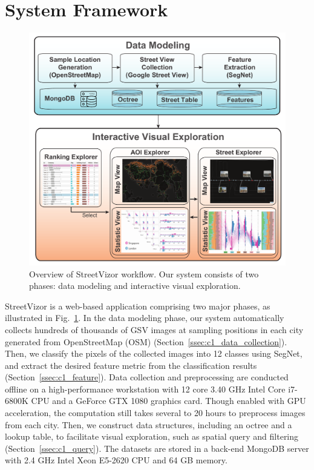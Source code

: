 \section{System Framework}



\begin{figure}[t]
	\centering
	\includegraphics[width=0.9\columnwidth]{figure/streetvizor/fig2_framework/framework}
	\vspace{-5mm}
	\caption{Overview of StreetVizor workflow. Our system consists of two phases: data modeling and interactive visual exploration.}
	\label{fig:c1_sys_overview}
	\vspace{-6mm}
\end{figure}

StreetVizor is a web-based application comprising two major phases, as illustrated in Fig.~\ref{fig:c1_sys_overview}.
In the data modeling phase, our system automatically collects hundreds of thousands of GSV images at sampling positions in each city generated from OpenStreetMap (OSM) (Section~\ref{ssec:c1_data_collection}).
Then, we classify the pixels of the collected images into 12 classes using SegNet, and extract the desired feature metric from the classification results (Section~\ref{ssec:c1_feature}).
Data collection and preprocessing are conducted offline on a high-performance workstation with 12 core 3.40 GHz Intel Core i7-6800K CPU and a GeForce GTX 1080 graphics card.
Though enabled with GPU acceleration, the computation still takes several to 20 hours to preprocess images from each city.
Then, we construct data structures, including an octree and a lookup table, to facilitate visual exploration, such as spatial query and filtering (Section~\ref{ssec:c1_query}).
The datasets are stored in a back-end MongoDB server with 2.4 GHz Intel Xeon E5-2620 CPU and 64 GB memory.

